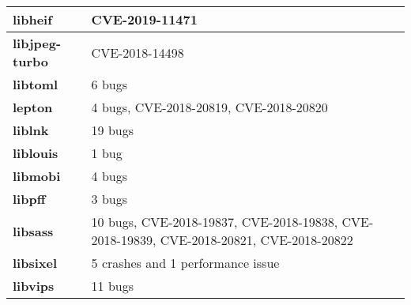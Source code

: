 \begin{longtable}{| p{} | p{} |}
\textbf{libheif}                 & CVE-2019-11471
    \\ \hline
\textbf{libjpeg-turbo}  & CVE-2018-14498                                                                                                                                                                                     \\ \hline
\textbf{libtoml}        & 6 bugs                                                                                                                                                                                             \\ \hline
\textbf{lepton}         & 4 bugs, CVE-2018-20819, CVE-2018-20820                                                                                                                                                                                         \\ \hline
\textbf{liblnk}         & 19 bugs                                                                                                                                                                                            \\ \hline
\textbf{liblouis}       & 1 bug                                                                                                                                                                                              \\ \hline
\textbf{libmobi}        & 4 bugs                                                                                                                                                                                             \\ \hline
\textbf{libpff}         & 3 bugs                                                                                                                                                                                             \\ \hline
\textbf{libsass}        & 10 bugs, CVE-2018-19837, CVE-2018-19838, CVE-2018-19839,  CVE-2018-20821, CVE-2018-20822                                                                                                                \\ \hline
\textbf{libsixel}       & 5 crashes and 1 performance issue                                                                                                                                                                  \\ \hline
\textbf{libvips}        & 11 bugs                                                                                                                                                                                            \\ \hline

\end{longtable}
